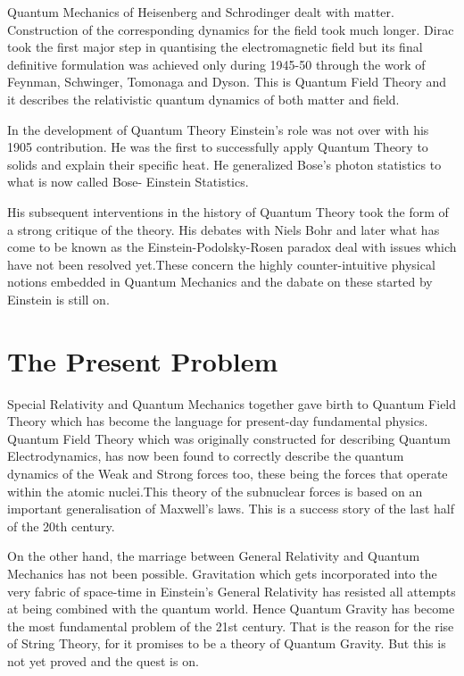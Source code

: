 Quantum Mechanics of Heisenberg and Schrodinger dealt with matter.
Construction of the corresponding dynamics for the field took
much longer. Dirac took the first major step in quantising the
electromagnetic field but its final definitive formulation was
achieved only during 1945-50 through the work of Feynman, Schwinger,
Tomonaga and Dyson. This is Quantum Field Theory and it describes
the relativistic quantum dynamics of both matter and field.

In the development of Quantum Theory Einstein's role was not over
with his 1905 contribution. He was the first to successfully apply
Quantum Theory to solids and explain their specific heat. He
generalized Bose's photon statistics to what is now called Bose-
Einstein Statistics.

His subsequent interventions in the history of Quantum Theory
took the form of a strong critique of the theory. His debates
with Niels Bohr and later what has come to be known as the
Einstein-Podolsky-Rosen paradox deal with issues which have not
been resolved yet.These concern the highly counter-intuitive
physical notions embedded in Quantum Mechanics and the dabate on
these started by Einstein is still on.

\section*{The Present Problem}

Special Relativity and Quantum Mechanics together gave birth to
Quantum Field Theory which has become the language for present-day
fundamental physics. Quantum Field Theory which was originally
constructed for describing Quantum Electrodynamics, has now been
found to correctly describe the quantum dynamics of the Weak and
Strong forces too, these being the forces that operate within the
atomic nuclei.This theory of the subnuclear forces is based on
an important generalisation of Maxwell's laws. This
is a success story of the last half of the 20th century.

On the other hand, the marriage between General Relativity and
Quantum Mechanics has not been possible. Gravitation which gets
incorporated into the very fabric of space-time in Einstein's
General Relativity has resisted all attempts at being combined
with the quantum world. Hence Quantum Gravity has become the
most fundamental problem of the 21st century. That is the reason
for the rise of String Theory, for it promises to be a theory
of Quantum Gravity. But this is not yet proved and the quest is on.

